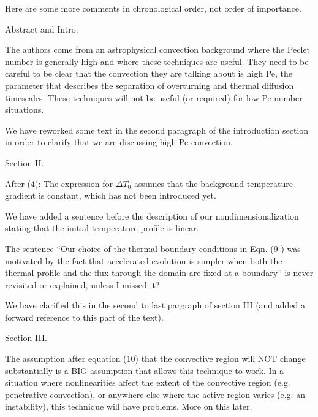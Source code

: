 \documentclass[aps, 11pt, singlecolumn]{revtex4-1} %
\begin{document}
\begin{singlespace}
\begin{myquotation}
Here are some more comments in chronological order, not order of
importance.

Abstract and Intro:

The authors come from an astrophysical convection background where the
Peclet number is generally high and where these techniques are useful.
They need to be careful to be clear that the convection they are
talking about is high Pe, the parameter that describes the separation
of overturning and thermal diffusion timescales. These techniques will
not be useful (or required) for low Pe number situations.
\end{myquotation}
We have reworked some text in the second paragraph of the introduction section
in order to clarify that we are discussing high Pe convection.

\begin{myquotation}
Section II.

After (4): The expression for $\Delta T_0$ assumes that the background
temperature gradient is constant, which has not been introduced yet.
\end{myquotation}
We have added a sentence before the description of our nondimensionalization
stating that the initial temperature profile is linear.

\begin{myquotation}
The sentence ``Our choice of the thermal boundary conditions in Eqn.
(9 ) was motivated by the fact that accelerated evolution is simpler
when both the thermal profile and the flux through the domain are
fixed at a boundary'' is never revisited or explained, unless I missed
it?
\end{myquotation}
We have clarified this in the second to last pargraph of section III 
(and added a forward reference to this part of the text). 

\begin{myquotation}
Section III.

The assumption after equation (10) that the convective region will NOT
change substantially is a BIG assumption that allows this technique to
work. In a situation where nonlinearities affect the extent of the
convective region (e.g. penetrative convection), or anywhere else
where the active region varies (e.g. an instability), this technique
will have problems. More on this later.


\end{myquotation}
\end{singlespace}
\end{document}
